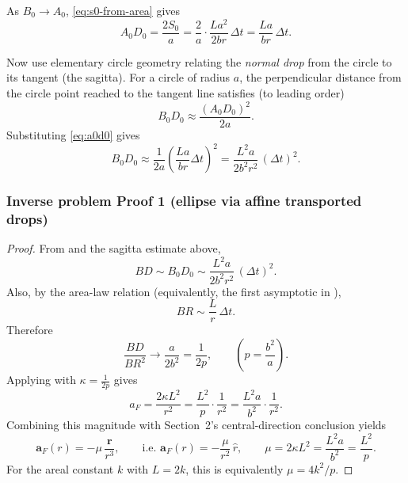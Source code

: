 As $B_0\to A_0$, \eqref{eq:s0-from-area} gives
\begin{equation}\label{eq:a0d0}
  A_0D_0 = \frac{2S_0}{a}=
  \frac{2}{a}\cdot\frac{L a^2}{2 b r}\,\Delta t
  =\frac{L a}{b r}\,\Delta t.
\end{equation}

Now use elementary circle geometry relating the \emph{normal drop} from the circle to its tangent (the sagitta). For a circle of radius $a$, the perpendicular distance from the circle point reached to the tangent line satisfies (to leading order)
\begin{equation}
  B_0D_0 \approx \frac{(A_0D_0)^2}{2a}.
\end{equation}
Substituting \eqref{eq:a0d0} gives
\begin{equation}
  B_0D_0 \approx \frac{1}{2a}\left(\frac{L a}{b r}\Delta t\right)^2
  = \frac{L^2 a}{2 b^2 r^2}\,(\Delta t)^2.
\end{equation}

\subsubsection{Inverse problem Proof 1 (ellipse via affine transported drops)}
\label{subsec:proof1-ellipse-affine}

\begin{proof}
From  and the sagitta estimate above,
\[
  BD\sim B_0D_0\sim \frac{L^2 a}{2 b^2 r^2}\,(\Delta t)^2.
\]
Also, by the area-law relation (equivalently, the first asymptotic in ),
\[
  BR\sim \frac{L}{r}\,\Delta t.
\]
Therefore
\[
  \frac{BD}{BR^2}\to \frac{a}{2b^2}=\frac{1}{2p},
  \qquad \left(p=\frac{b^2}{a}\right).
\]
Applying  with $\kappa=\frac{1}{2p}$ gives
\[
  a_F=\frac{2\kappa L^2}{r^2}
  =\frac{L^2}{p}\cdot\frac{1}{r^2}
  =\frac{L^2 a}{b^2}\cdot\frac{1}{r^2}.
\]
Combining this magnitude with Section~2's central-direction conclusion yields
\[
  \mathbf a_F(r) = -\mu\,\frac{\mathbf r}{r^3},
  \qquad
  \text{i.e. }\mathbf a_F(r)=-\frac{\mu}{r^2}\,\hat r,
  \qquad
  \mu=2\kappa L^2=\frac{L^2a}{b^2}=\frac{L^2}{p}.
\]
For the areal constant $k$ with $L=2k$, this is equivalently $\mu=4k^2/p$.
\end{proof}


